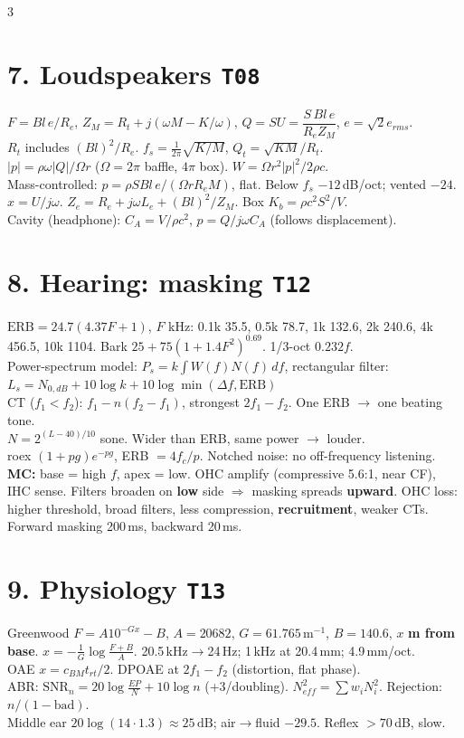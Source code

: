 \documentclass[10pt]{article}
\newcommand{\T}[1]{\textcolor{sec}{\texttt{#1}}}
\newcommand{\dB}{\,\mathrm{dB}}
\begin{document}
\begin{multicols*}{3}
\section{7. Loudspeakers \quad\T{T08}}
$F=Bl\,e/R_e$, $Z_M=R_t+j(\omega M-K/\omega)$, $Q=SU=\dfrac{S\,Bl\,e}{R_eZ_M}$, $e=\sqrt2e_{rms}$.\\
$R_t$ includes $(Bl)^2/R_e$. $f_s=\frac1{2\pi}\sqrt{K/M}$, $Q_t=\sqrt{KM}/R_t$.\\
$|p|=\rho\omega|Q|/\Omega r$ ($\Omega=2\pi$ baffle, $4\pi$ box). $W=\Omega r^2|p|^2/2\rho c$.\\
Mass-controlled: $p=\rho SBl\,e/(\Omega rR_eM)$, flat. Below $f_s$ $-12$\,dB/oct; vented $-24$.\\
$x=U/j\omega$. $Z_e=R_e+j\omega L_e+(Bl)^2/Z_M$. Box $K_b=\rho c^2S^2/V$.\\
Cavity (headphone): $C_A=V/\rho c^2$, $p=Q/j\omega C_A$ (follows displacement).

\section{8. Hearing: masking \quad\T{T12}}
$\boxed{\mathrm{ERB}=24.7(4.37F+1)}$, $F$ kHz: 0.1k 35.5, 0.5k 78.7, 1k 132.6, 2k 240.6, 4k 456.5, 10k 1104. Bark $25+75(1+1.4F^2)^{0.69}$. 1/3-oct $0.232f$.\\
Power-spectrum model: $P_s=k\!\int\!W(f)N(f)\,df$, rectangular filter:\\
\hspace*{6pt}$\boxed{L_s=N_{0,dB}+10\log k+10\log\min(\Delta f,\mathrm{ERB})}$\\
CT ($f_1<f_2$): $f_1-n(f_2-f_1)$, strongest $2f_1-f_2$. One ERB $\to$ one beating tone.\\
$N=2^{(L-40)/10}$ sone. Wider than ERB, same power $\to$ louder.\\
roex $(1+pg)e^{-pg}$, ERB $=4f_c/p$. Notched noise: no off-frequency listening.\\
\textbf{MC:} base = high $f$, apex = low. OHC amplify (compressive 5.6:1, near CF), IHC sense. Filters broaden on \textbf{low} side $\Rightarrow$ masking spreads \textbf{upward}. OHC loss: higher threshold, broad filters, less compression, \textbf{recruitment}, weaker CTs. Forward masking 200\,ms, backward 20\,ms.

\section{9. Physiology \quad\T{T13}}
Greenwood $F=A10^{-Gx}-B$, $A=20682$, $G=61.765$\,m$^{-1}$, $B=140.6$, $x$ \textbf{m from base}. $x=-\frac1G\log\frac{F+B}{A}$. 20.5\,kHz$\to$24\,Hz; 1\,kHz at 20.4\,mm; 4.9\,mm/oct.\\
OAE $x=c_{BM}t_{rt}/2$. DPOAE at $2f_1-f_2$ (distortion, flat phase).\\
ABR: $\mathrm{SNR}_n=20\log\frac{EP}{N}+10\log n$ (+3/doubling). $N^2_{eff}=\sum w_iN_i^2$. Rejection: $n/(1-\text{bad})$.\\
Middle ear $20\log(14\cdot1.3)\approx25\dB$; air$\to$fluid $-29.5$. Reflex $>70$\,dB, slow.


\end{multicols*}
\end{document}
